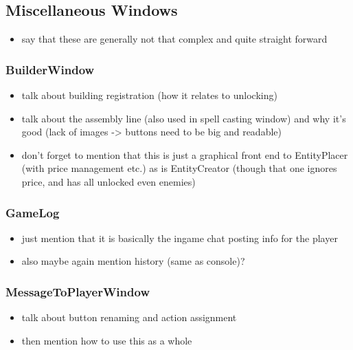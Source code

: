 \subsection{Miscellaneous Windows}

\begin{itemize}
    \item say that these are generally not that complex and quite straight forward
\end{itemize}

\subsubsection{BuilderWindow}

\begin{itemize}
    \item talk about building registration (how it relates to unlocking)
    \item talk about the assembly line (also used in spell casting window)
        and why it's good (lack of images -> buttons need to be big and readable)
    \item don't forget to mention that this is just a graphical front end
        to EntityPlacer (with price management etc.) as is EntityCreator (though
        that one ignores price, and has all unlocked even enemies)
\end{itemize}

\subsubsection{GameLog}

\begin{itemize}
    \item just mention that it is basically the ingame chat posting info
        for the player
    \item also maybe again mention history (same as console)?
\end{itemize}

\subsubsection{MessageToPlayerWindow}

\begin{itemize}
    \item talk about button renaming and action assignment
    \item then mention how to use this as a whole
\end{itemize}

